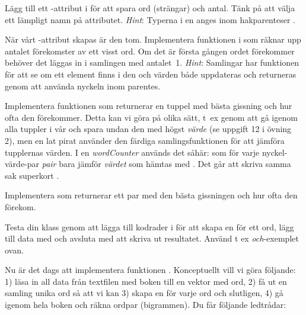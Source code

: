 \Subtask Lägg till ett -attribut i  för att spara ord (strängar) och antal. Tänk på att välja ett lämpligt namn på attributet. \emph{Hint}: Typerna i en  anges inom hakparenteser . 

\Subtask När vårt -attribut skapas är den tom. Implementera funktionen  i  som räknar upp antalet förekomster av ett visst ord. Om det är första gången ordet förekommer behöver det läggas in i samlingen med antalet~1. \emph{Hint}: Samlingar har funktionen  för att se om ett element finns i den och värden både uppdateras och returneras genom att använda nyckeln inom parentes.

\Subtask Implementera funktionen  som returnerar en tuppel med bästa gissning och hur ofta den förekommer. Detta kan vi göra på olika sätt, t~ex genom att gå igenom alla tuppler i vår  och spara undan den med högst \emph{värde} (se uppgift 12 i övning 2), men en lat pirat använder den färdiga samlingsfunktionen  för att jämföra tupplernas värden. I en  \emph{wordCounter} används det såhär:  som för varje nyckel-värde-par \emph{pair} bara jämför \emph{värdet} som hämtas med . Det går att skriva samma sak superkort .

\Subtask Implementera  som returnerar ett par med den bästa gissningen och hur ofta den förekom. 

\Subtask Testa din klass genom att lägga till kodrader i  för att skapa en  för ett ord, lägg till data med  och avsluta med att skriva ut resultatet. Använd t ex  \emph{och}-exemplet ovan.

\Subtask Nu är det dags att implementera funktionen . Konceptuellt vill vi göra följande: 1) läsa in all data från textfilen med boken till en vektor med ord, 2) få ut en samling unika ord så att vi kan 3) skapa en  för varje ord och slutligen, 4) gå igenom hela boken och räkna ordpar (bigrammen).  
\noindent
Du får följande ledtrådar: 

